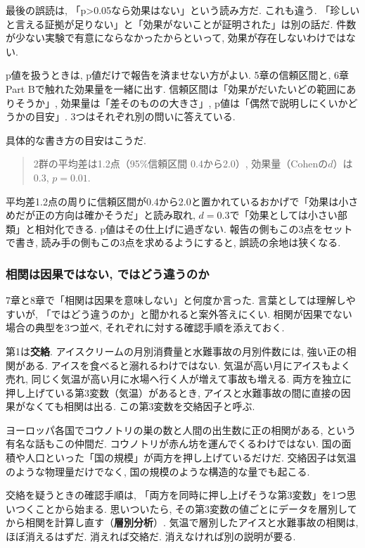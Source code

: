 最後の誤読は, 「p>0.05なら効果はない」という読み方だ.
これも違う. 「珍しいと言える証拠が足りない」と「効果がないことが証明された」は別の話だ.
件数が少ない実験で有意にならなかったからといって, 効果が存在しないわけではない.

p値を扱うときは, p値だけで報告を済ませない方がよい.
5章の信頼区間と, 6章Part Bで触れた効果量を一緒に出す.
信頼区間は「効果がだいたいどの範囲にありそうか」, 効果量は「差そのものの大きさ」, p値は「偶然で説明しにくいかどうかの目安」.
3つはそれぞれ別の問いに答えている.

具体的な書き方の目安はこうだ.

\begin{quote}
2群の平均差は1.2点（95\%信頼区間 0.4から2.0）, 効果量（Cohenの$d$）は0.3, $p = 0.01$.
\end{quote}

平均差1.2点の周りに信頼区間が0.4から2.0と置かれているおかげで「効果は小さめだが正の方向は確かそうだ」と読み取れ, $d = 0.3$で「効果としては小さい部類」と相対化できる. p値はその仕上げに過ぎない.
報告の側もこの3点をセットで書き, 読み手の側もこの3点を求めるようにすると, 誤読の余地は狭くなる.

\subsubsection*{相関は因果ではない, ではどう違うのか}

7章と8章で「相関は因果を意味しない」と何度か言った.
言葉としては理解しやすいが, 「ではどう違うのか」と聞かれると案外答えにくい.
相関が因果でない場合の典型を3つ並べ, それぞれに対する確認手順を添えておく.

第1は\textbf{交絡}.
アイスクリームの月別消費量と水難事故の月別件数には, 強い正の相関がある.
アイスを食べると溺れるわけではない. 気温が高い月にアイスもよく売れ, 同じく気温が高い月に水場へ行く人が増えて事故も増える.
両方を独立に押し上げている第3変数（気温）があるとき, アイスと水難事故の間に直接の因果がなくても相関は出る.
この第3変数を交絡因子と呼ぶ.

ヨーロッパ各国でコウノトリの巣の数と人間の出生数に正の相関がある, という有名な話もこの仲間だ.
コウノトリが赤ん坊を運んでくるわけではない. 国の面積や人口といった「国の規模」が両方を押し上げているだけだ.
交絡因子は気温のような物理量だけでなく, 国の規模のような構造的な量でも起こる.

交絡を疑うときの確認手順は, 「両方を同時に押し上げそうな第3変数」を1つ思いつくことから始まる.
思いついたら, その第3変数の値ごとにデータを層別してから相関を計算し直す（\textbf{層別分析}）.
気温で層別したアイスと水難事故の相関は, ほぼ消えるはずだ.
消えれば交絡だ. 消えなければ別の説明が要る.

